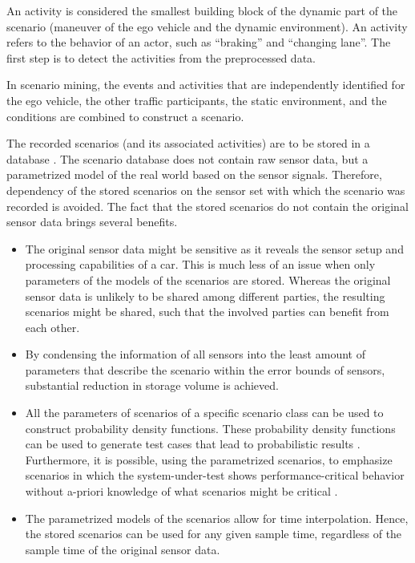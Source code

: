 An activity is considered the smallest building block of the dynamic part of the scenario (maneuver of the ego vehicle and the dynamic environment). An activity refers to the behavior of an actor, such as ``braking'' and ``changing lane''. The first step is to detect the activities from the preprocessed data. 

In scenario mining, the events and activities that are independently identified for the ego vehicle, the other traffic participants, the static environment, and the conditions are combined to construct a scenario. 

The recorded scenarios (and its associated activities) are to be stored in a database \cite{elrofai2018scenario}. The scenario database does not contain raw sensor data, but a parametrized model of the real world based on the sensor signals. Therefore, dependency of the stored scenarios on the sensor set with which the scenario was recorded is avoided. The fact that the stored scenarios do not contain the original sensor data brings several benefits. 
\begin{itemize}
	\item The original sensor data might be sensitive as it reveals the sensor setup and processing capabilities of a car. This is much less of an issue when only parameters of the models of the scenarios are stored. Whereas the original sensor data is unlikely to be shared among different parties, the resulting scenarios might be shared, such that the involved parties can benefit from each other.
	\item By condensing the information of all sensors into the least amount of parameters that describe the scenario within the error bounds of sensors, substantial reduction in storage volume is achieved.
	\item All the parameters of scenarios of a specific scenario class can be used to construct probability density functions. These probability density functions can be used to generate test cases that lead to probabilistic results \cite{deGelder2017assessment}. Furthermore, it is possible, using the parametrized scenarios, to emphasize scenarios in which the system-under-test shows performance-critical behavior without a-priori knowledge of what scenarios might be critical \cite{deGelder2017assessment}. 
	\item The parametrized models of the scenarios allow for time interpolation. Hence, the stored scenarios can be used for any given sample time, regardless of the sample time of the original sensor data. 
\end{itemize}

